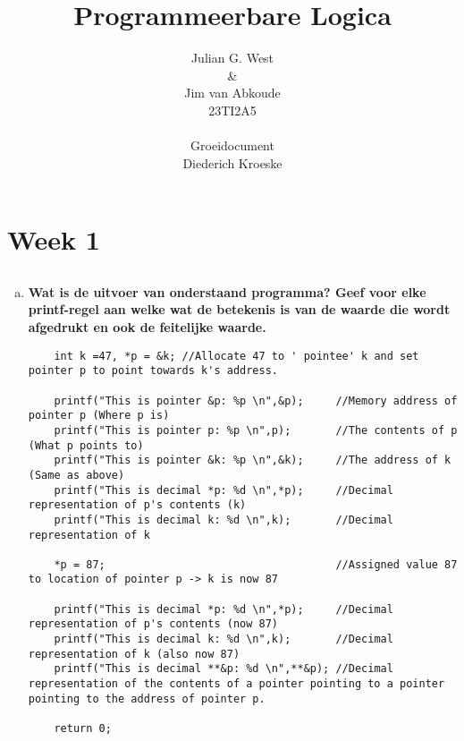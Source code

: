 \documentclass[10pt,a4paper]{report}
\author{Julian G. West \\ \& \\ Jim van Abkoude \\ 23TI2A5 \\ ~~~~\\ Groeidocument \\ Diederich Kroeske}
\title{Programmeerbare Logica}
\begin{document}
\maketitle
\tableofcontents
\chapter*{Week 1}
\setcounter{section}{-1}
\setcounter{chapter}{5}
\section{}
\begin{enumerate}[(a)]
\item \textbf{Wat is de uitvoer van onderstaand programma? Geef voor elke printf-regel aan welke wat de betekenis is van de waarde die wordt afgedrukt en ook de feitelijke waarde.}
\\
\begin{lstlisting}
	int k =47, *p = &k; //Allocate 47 to ' pointee' k and set pointer p to point towards k's address.

	printf("This is pointer &p: %p \n",&p);   	//Memory address of pointer p (Where p is)
	printf("This is pointer p: %p \n",p);     	//The contents of p (What p points to)
	printf("This is pointer &k: %p \n",&k);   	//The address of k (Same as above)
	printf("This is decimal *p: %d \n",*p);   	//Decimal representation of p's contents (k)
	printf("This is decimal k: %d \n",k);		//Decimal representation of k

	*p = 87;									//Assigned value 87 to location of pointer p -> k is now 87

	printf("This is decimal *p: %d \n",*p);		//Decimal representation of p's contents (now 87)
	printf("This is decimal k: %d \n",k);		//Decimal representation of k (also now 87)
	printf("This is decimal **&p: %d \n",**&p);	//Decimal representation of the contents of a pointer pointing to a pointer pointing to the address of pointer p.

	return 0;
\end{lstlisting}


\end{enumerate}
\end{document}

